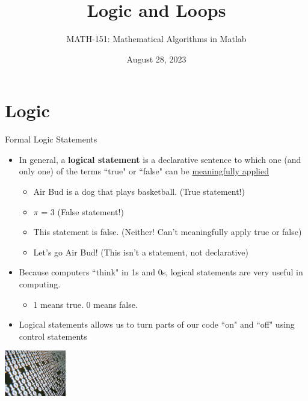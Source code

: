 {}\documentclass[letterpaper,
compress,
xcolor=x11names,
]{beamer}
\begin{document}
	\title{Logic and Loops}
	\author{MATH-151:  Mathematical Algorithms in Matlab}
	\date[202X]{August 28, 2023}




\begin{frame}
\titlepage
\end{frame}
\section{Logic}

\begin{frame}{Formal Logic Statements}
	\footnotesize
	\begin{itemize}
		\item In general, a \textbf{logical statement} is a declarative sentence to which one (and only one) of the terms ``true" or ``false" can be \underline{meaningfully applied}
		\begin{itemize}
			\item Air Bud is a dog that plays basketball. (True statement!)
			\item $\pi$ = 3 (False statement!)
			\item This statement is false. (Neither! Can't meaningfully apply true or false)
			\item Let's go Air Bud! (This isn't a statement, not declarative) 
		\end{itemize}
		\item Because computers ``think" in 1s and 0s, logical statements are very useful in computing.
		\begin{itemize}
			\item 1 means true. 0 means false.
		\end{itemize}
		\item Logical statements allows us to turn parts of our code ``on" and ``off" using control statements
	\end{itemize}
	\begin{center}
		\includegraphics[height = 2cm]{ones_n_zeros.jpg}
	\end{center}
\end{frame}
\end{document}
